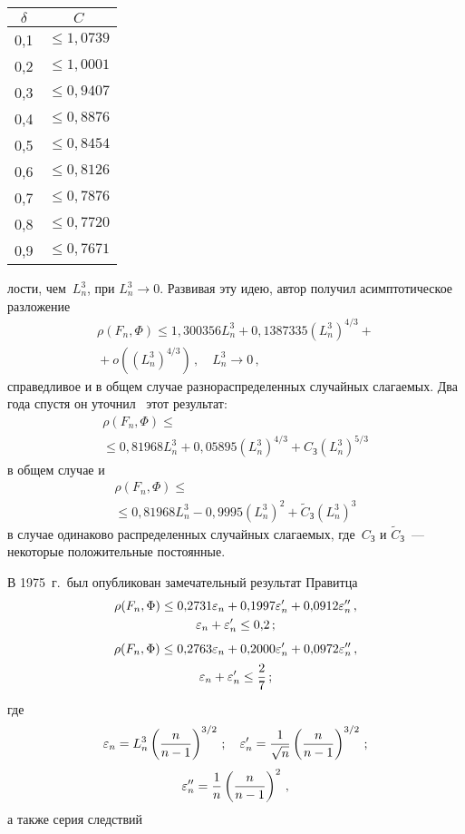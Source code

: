\begin{multicols}{2}
{\small
\begin{center}
\tabcolsep=15pt
\begin{tabular}{|c|c|}
 \hline
$\delta$& $C$\\
\hline
0,1& $\le 1{,}0739$\\
0,2& $\le 1{,}0001$\\
0,3& $\le 0{,}9407$\\
0,4& $\le 0{,}8876$\\
0,5& $\le 0{,}8454$\\
0,6& $\le 0{,}8126$\\
0,7& $\le 0{,}7876$\\
0,8& $\le 0{,}7720$\\
0,9& $\le 0{,}7671$\\
\hline
\end{tabular}
\end{center}
}
\vspace*{6pt}


\bigskip
\addtocounter{table}{1}


\noindent
лости, чем~$L_n^3$,
при $L_n^3\to0$. Развивая эту идею, автор получил
асимптотическое разложение
\begin{multline*}
\rho(F_n,\Phi)\le 1{,}300356
L_n^3+0{,}1387335\left(L_n^3\right)^{4/3}+{}\\
{}+
o\left(\left(L_n^3\right)^{4/3}\right)\,,\quad L_n^3\to 0\,,
\end{multline*}
справедливое и в общем случае разнораспределенных случайных
слагаемых. Два года спустя он уточнил~\cite{Zolotarev1967a,
Zolotarev1967b} этот результат:
\begin{multline}
\label{ZolotarevExpDifferentDistr}
\rho(F_n,\Phi)\le{}\\
{}\le 0{,}81968 L_n^3+0{,}05895\left(L_n^3\right)^{4/3}+
C_{\mathrm{З}}\left(L_n^3\right)^{5/3}
\end{multline}
в общем случае и
\begin{multline}
\label{ZolotarevExpIdenticalDistr}
\rho(F_n,\Phi)\le{}\\
{}\le 0{,}81968
L_n^3-0{,}9995\left(L_n^3\right)^2+\widetilde C_{\mathrm{З}}\left(L_n^3\right)^3
\end{multline}
в случае одинаково распределенных случайных слагаемых, где~$C_{\mathrm{З}}$ и
$\widetilde C_{\mathrm{З}}$~--- некоторые положительные постоянные.

В 1975~г.\ был опубликован замечательный результат Правитца~\cite{Prawitz1975}
\begin{multline*}
\rho(F_n,\Phi)\le 0{,}2731\varepsilon_n+0{,}1997\varepsilon_n'+ 0{,}0912
\varepsilon_n''\,,\\
\varepsilon_n+\varepsilon_n'\le 0{,}2\,;
\end{multline*}
\begin{multline*}
\rho(F_n,\Phi)\le 0{,}2763\varepsilon_n+0{,}2000\varepsilon_n'+ 0{,}0972
\varepsilon_n''\,,\\
\varepsilon_n+\varepsilon_n'\le \displaystyle\frac{\displaystyle 2\mathstrut}{\displaystyle 7\mathstrut}\,;
\end{multline*}
где
$$
\varepsilon_n=L_n^3\left(\displaystyle\frac{\displaystyle n\mathstrut}{\displaystyle n-1\mathstrut}\right)^{3/2}\,;\quad
\varepsilon_n'=\displaystyle\frac{\displaystyle 1\mathstrut}{\displaystyle \sqrt n\mathstrut}\left(\displaystyle\frac{\displaystyle n\mathstrut}{\displaystyle n-1\mathstrut}\right)^{3/2}\,;
$$
$$
\varepsilon_n''=\displaystyle\frac{\displaystyle 1\mathstrut}{\displaystyle n\mathstrut}\left(\displaystyle\frac{\displaystyle n\mathstrut}{\displaystyle n-1\mathstrut}\right)^2\,,
$$
а также серия следствий
\pagebreak


\end{multicols}
